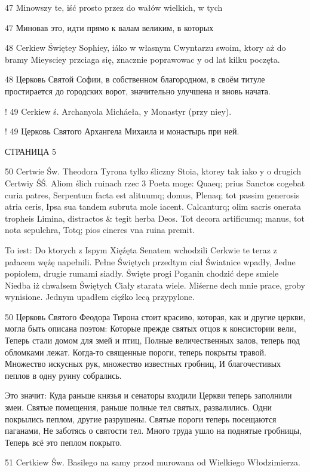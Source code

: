 47 Minowszy te, iść prosto przez do wałów wielkich, w tych

47 Миновав это, идти прямо к валам великим, в которых

48 Cerkiew Świętey Sophiey, iáko w własnym Cwyntarzu swoim, ktory aż do bramy Mieysciey przciaga się, znacznie poprawowac y od lat kilku  poczęta.

48 Церковь Святой Софии, в собственном благородном, в своём титуле простирается до городских ворот, значительно улучшена и вновь начата.


! 49 Cerkiew ś. Archanyola Micháeła, y Monastyr (przy niey).

! 49 Церковь Святого Архангела Михаила и монастырь при ней.

СТРАНИЦА 5


50 Certwie Św. Theodora Tyrona tylko śliczny Stoia, ktorey tak iako y o drugich Certwiy ŚŚ. Aliom ślich ruinach rzec 3 Poeta moge: Quaeq; prius Sanctos cogebat curia patres, Serpentum facta est alituumq; domus, Plenaq; tot passim generosis atria ceris, Ipsa sua tandem subruta mole iacent. Calcanturq; olim sacris onerata tropheis Limina, distractos \& tegit herba Deos. Tot decora artificumq; manus, tot nota sepulchra, Totq; pios cineres vna ruina premit.

To iest: Do ktorych z Ispym Xięźęta Senatem wchodzili Cerkwie te teraz z pałacem węźę napełnili. Pełne Świętych przedtym ciał Światnice wpadły, Jedne popiołem, drugie rumami siadły. Święte progi Poganin chodzić depe smiele Niedba iż chwałsem Świętych Ciały starata wiele. Miśerne dech mnie prace, groby wynisione. Jednym upadłem cięźko lecą przypylone.

50 Церковь Святого Феодора Тирона стоит красиво, которая, как и другие церкви, могла быть описана поэтом: Которые прежде святых отцов к консистории вели, Теперь стали домом для змей и птиц, Полные величественных залов, теперь под обломками лежат. Когда-то священные пороги, теперь покрыты травой. Множество искусных рук, множество известных гробниц, И благочестивых пеплов в одну руину собрались.

Это значит: Куда раньше князья и сенаторы входили Церкви теперь заполнили змеи. Святые помещения, раньше полные тел святых, развалились. Одни покрылись пеплом, другие разрушены. Святые пороги теперь посещаются паганами, Не заботясь о святости тел. Много труда ушло на поднятые гробницы, Теперь всё это пеплом покрыто.

51 Certkiew Św. Basilego na samy przod murowana od Wielkiego Włodzimierza.

